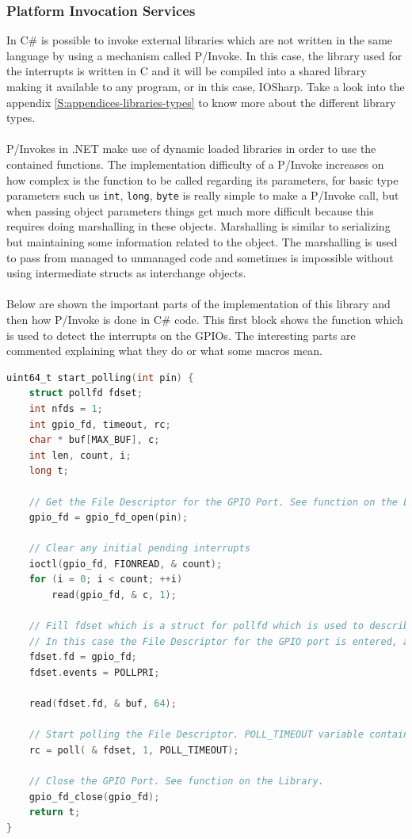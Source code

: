 \subsubsection{Platform Invocation Services}\label{SSS:IOSharp-Interrupt-PInvoke}
In C\# is possible to invoke external libraries which are not written in the same language by using a mechanism called P/Invoke. In this case, the library used for the interrupts is written in C and it will be compiled into a shared library making it available to any program, or in this case, IOSharp. Take a look into the appendix \ref{S:appendices-libraries-types} to know more about the different library types.
\\
\\
P/Invokes in .NET make use of dynamic loaded libraries in order to use the contained functions. The implementation difficulty of a P/Invoke increases on how complex is the function to be called regarding its parameters, for basic type parameters such us \verb!int!, \verb!long!, \verb!byte! is really simple to make a P/Invoke call, but when passing object parameters things get much more difficult because this requires doing marshalling in these objects. Marshalling is similar to serializing but maintaining some information related to the object. The marshalling is used to pass from managed to unmanaged code and sometimes is impossible without using intermediate structs as interchange objects.
\\
\\
Below are shown the important parts of the implementation of this library and then how P/Invoke is done in C\# code. This first block shows the function which is used to detect the interrupts on the GPIOs. The interesting parts are commented explaining what they do or what some macros mean.
\begin{lstlisting}[language=C, caption={IOSharp.c - Polling function}]
uint64_t start_polling(int pin) {
    struct pollfd fdset;
    int nfds = 1;
    int gpio_fd, timeout, rc;
    char * buf[MAX_BUF], c;
    int len, count, i;
    long t;

    // Get the File Descriptor for the GPIO Port. See function on the Library.
    gpio_fd = gpio_fd_open(pin);

    // Clear any initial pending interrupts
    ioctl(gpio_fd, FIONREAD, & count);
    for (i = 0; i < count; ++i)
        read(gpio_fd, & c, 1);

    // Fill fdset which is a struct for pollfd which is used to describe the polling system.
    // In this case the File Descriptor for the GPIO port is entered, and then the POLLPRI (Data Urgent to Read) is configured as the event type.
    fdset.fd = gpio_fd;
    fdset.events = POLLPRI;

    read(fdset.fd, & buf, 64);

    // Start polling the File Descriptor. POLL_TIMEOUT variable contains (-1) which stands for infinite blocking until event.
    rc = poll( & fdset, 1, POLL_TIMEOUT);

    // Close the GPIO Port. See function on the Library.
    gpio_fd_close(gpio_fd);
    return t;
}
\end{lstlisting}
